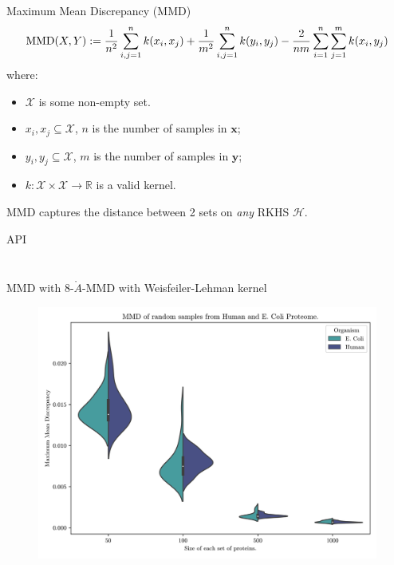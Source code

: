 \documentclass[aspectratio=169, 10pt, dvipsnames]{beamer}
\begin{document}
\begin{frame}[fragile]{Maximum Mean Discrepancy (MMD)}
  \begin{equation*}
    \text{MMD}(X, Y) := {1\over n^2} \sum_{i,j=1}^{n}k(x_i, x_j) + {1\over m^2} \sum_{i,j=1}^{n}k(y_i, y_j) - {2\over nm} \sum_{i=1}^{n}\sum_{j=1}^{m}k(x_i, y_j)
  \end{equation*}
    where:
    \begin{itemize}
    \item $\mathcal{X}$ is some non-empty set.
    \item  $x_i, x_j \subseteq \mathcal{X}$, $n$ is the number of samples in $\mathbf{x}$;
    \item  $y_i, y_j \subseteq \mathcal{X}$, $m$ is the number of samples in $\mathbf{y}$;
    \item $k: \mathcal{X}\times\mathcal{X}\to\mathbb{R}$ is a valid kernel.
    \end{itemize}

    \small MMD captures the distance between 2 sets on \emph{any} RKHS $\mathcal{H}$.
  \end{frame}

{
  \begin{frame}[fragile]{API}
    \begin{minipage}{.45\textwidth}
      \inputminted[firstline=1, lastline=15]{python}{example_pipeline_with_noise.py}
    \end{minipage}
    \hfill
    \pause
    \begin{minipage}{.45\textwidth}
      \inputminted[firstline=17, lastline=26]{python}{example_pipeline_with_noise.py}
    \end{minipage}
  \end{frame}

  \begin{frame}[fragile]{MMD with 8-$\mathring{A}$-MMD with Weisfeiler-Lehman kernel}
    \begin{figure}
      \centering
      \includegraphics[height=\textheight]{./figures/mmd_variance_baseline.png}
    \end{figure}
  \end{frame}
}
\end{document}

